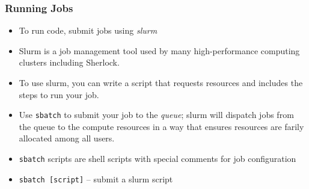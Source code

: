 \documentclass[aspectratio=169]{beamer}
\begin{document}
\begin{frame}
	\frametitle{Running Jobs}
	\begin{itemize}
		\item To run code, submit jobs using \emph{slurm}
		\item Slurm is a job management tool used by many high-performance computing clusters including Sherlock.
		\item To use slurm, you can write a script that requests resources and includes the steps to run your job.
		\item Use \texttt{sbatch} to submit your job to the \emph{queue}; slurm will dispatch jobs from the queue to the compute resources in a way that ensures resources are farily allocated among all users.
		\item \texttt{sbatch} scripts are shell scripts with special comments for job configuration
		\item \texttt{sbatch [script]} -- submit a slurm script
	\end{itemize}
\end{frame}



\end{document}
